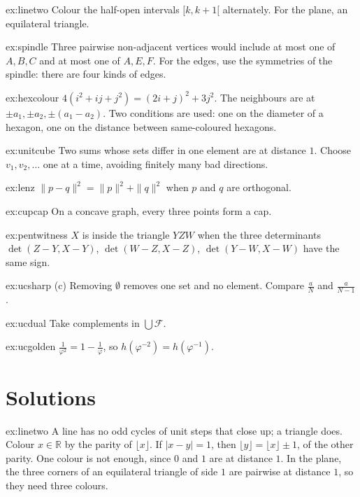 \begin{hint}{ex:linetwo}
Colour the half-open intervals $[k,k+1[$ alternately. For the plane, an equilateral triangle.
\end{hint}
\begin{hint}{ex:spindle}
Three pairwise non-adjacent vertices would include at most one of $A,B,C$ and at most one of $A,E,F$. For the edges, use the symmetries of the spindle:
there are four kinds of edges.
\end{hint}
\begin{hint}{ex:hexcolour}
$4(i^2+ij+j^2)=(2i+j)^2+3j^2$.
The neighbours are at $\pm a_1,\pm a_2,\pm(a_1-a_2)$. Two conditions are used: one on the diameter of a hexagon, one on the distance between
same-coloured hexagons.
\end{hint}
\begin{hint}{ex:unitcube}
Two sums whose sets differ in one element are at distance $1$. Choose $v_1,v_2,\dots$ one at a time, avoiding finitely many bad directions.
\end{hint}
\begin{hint}{ex:lenz}
$\|p-q\|^2=\|p\|^2+\|q\|^2$ when $p$ and $q$ are orthogonal.
\end{hint}
\begin{hint}{ex:cupcap}
On a concave graph, every three points form a cap.
\end{hint}
\begin{hint}{ex:pentwitness}
$X$ is inside the triangle $YZW$ when the three determinants $\det(Z-Y,X-Y)$, $\det(W-Z,X-Z)$, $\det(Y-W,X-W)$ have the same sign.
\end{hint}
\begin{hint}{ex:ucsharp}
(c) Removing $\emptyset$ removes one set and no element. Compare $\frac aN$ and $\frac a{N-1}$.
\end{hint}
\begin{hint}{ex:ucdual}
Take complements in $\bigcup\mathcal F$.
\end{hint}
\begin{hint}{ex:ucgolden}
$\frac1{\varphi^2}=1-\frac1\varphi$, so $h(\varphi^{-2})=h(\varphi^{-1})$.
\end{hint}

\section{Solutions}

\begin{solution}{ex:linetwo}
\idea A line has no odd cycles of unit steps that close up; a triangle does.
\writeup Colour $x\in\mathbb R$ by the parity of $\lfloor x\rfloor$. If $|x-y|=1$, then $\lfloor y\rfloor=\lfloor x\rfloor\pm1$, of the other parity. One
colour is not enough, since $0$ and $1$ are at distance $1$. In the plane, the three corners of an equilateral triangle of side $1$ are pairwise at
distance $1$, so they need three colours.
\end{solution}

